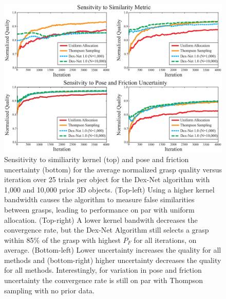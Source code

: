 \begin{figure}[t!]
\centering
\includegraphics[scale=0.22]{figures/illustrations/combined_weight_and_u_sensitivity.eps}
\caption{Sensitivity to similiarity kernel (top) and pose and friction uncertainty (bottom) for the average normalized grasp quality versus iteration over 25 trials per object for the Dex-Net algorithm with 1,000 and 10,000 prior 3D objects.
(Top-left) Using a higher kernel bandwidth causes the algorithm to measure false similarities between grasps, leading to performance on par with uniform allocation.
(Top-right) A lower kernel bandwith decreases the convergence rate, but the Dex-Net Algorithm still selects a grasp within 85\% of the grasp with highest $P_F$ for all iterations, on average.
(Bottom-left) Lower uncertainty increases the quality for all methods and (bottom-right) higher uncertainty decreases the quality for all methods.
Interestingly, for variation in pose and friction uncertainty the convergence rate is still on par with Thompson sampling with no prior data.
}
\vspace*{-15pt}
\end{figure}